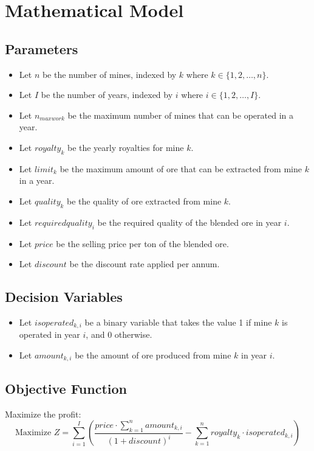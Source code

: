 \documentclass{article}
\begin{document}
\section*{Mathematical Model}

\subsection*{Parameters}
\begin{itemize}
    \item Let \( n \) be the number of mines, indexed by \( k \) where \( k \in \{1, 2, \ldots, n\} \).
    \item Let \( I \) be the number of years, indexed by \( i \) where \( i \in \{1, 2, \ldots, I\} \).
    \item Let \( n_{maxwork} \) be the maximum number of mines that can be operated in a year.
    \item Let \( royalty_k \) be the yearly royalties for mine \( k \).
    \item Let \( limit_k \) be the maximum amount of ore that can be extracted from mine \( k \) in a year.
    \item Let \( quality_k \) be the quality of ore extracted from mine \( k \).
    \item Let \( requiredquality_i \) be the required quality of the blended ore in year \( i \).
    \item Let \( price \) be the selling price per ton of the blended ore.
    \item Let \( discount \) be the discount rate applied per annum.
\end{itemize}

\subsection*{Decision Variables}
\begin{itemize}
    \item Let \( isoperated_{k,i} \) be a binary variable that takes the value 1 if mine \( k \) is operated in year \( i \), and 0 otherwise.
    \item Let \( amount_{k,i} \) be the amount of ore produced from mine \( k \) in year \( i \).
\end{itemize}

\subsection*{Objective Function}
Maximize the profit:
\[
\text{Maximize } Z = \sum_{i=1}^{I} \left( \frac{price \cdot \sum_{k=1}^{n} amount_{k,i}}{(1 + discount)^{i}} - \sum_{k=1}^{n} royalty_k \cdot isoperated_{k,i} \right)
\]
\end{document}
